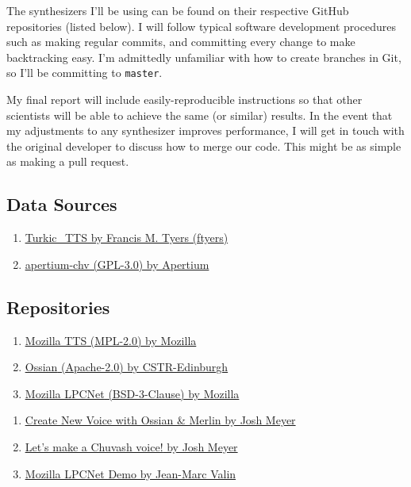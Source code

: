 \documentclass[fleqn,10pt]{SelfArx} %
\begin{document}
The synthesizers I'll be using can be found on their respective GitHub repositories (listed below). I will follow typical software development procedures such as making regular commits, and committing every change to make backtracking easy. I'm admittedly unfamiliar with how to create branches in Git, so I'll be committing to \texttt{master}.

My final report will include easily-reproducible instructions so that other scientists will be able to achieve the same (or similar) results. In the event that my adjustments to any synthesizer improves performance, I will get in touch with the original developer to discuss how to merge our code. This might be as simple as making a pull request.

\subsection{Data Sources}
\begin{enumerate}
	\item \href{https://github.com/ftyers/Turkic_TTS}{\underline{Turkic\_TTS} by Francis M. Tyers (ftyers)}
	\item \href{https://github.com/apertium/apertium-chv}{\underline{apertium-chv} (GPL-3.0) by Apertium}
\end{enumerate}

\subsection{Repositories}
\begin{enumerate}
	\item \href{https://github.com/mozilla/TTS}{\underline{Mozilla TTS} (MPL-2.0) by Mozilla}
	\item \href{https://github.com/CSTR-Edinburgh/Ossian}{\underline{Ossian} (Apache-2.0) by CSTR-Edinburgh}
	\item \href{https://github.com/mozilla/LPCNet}{\underline{Mozilla LPCNet} (BSD-3-Clause) by Mozilla}
\end{enumerate}





\begin{enumerate}
	\item \href{http://jrmeyer.github.io/tts/2017/09/15/Ossian-Merlin-demo.html}{\underline{Create New Voice with Ossian \& Merlin} by Josh Meyer}
	\item \href{http://jrmeyer.github.io/tts/2016/12/09/tts-workshop.html}{\underline{Let's make a Chuvash voice!} by Josh Meyer}
	\item \href{https://people.xiph.org/~jm/demo/lpcnet/}{\underline{Mozilla LPCNet Demo} by Jean-Marc Valin}
\end{enumerate}

\end{document}
